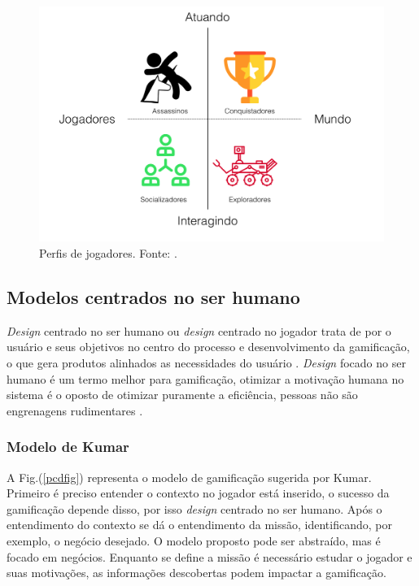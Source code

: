 \begin{figure}[h]
	\centering
		\includegraphics[keepaspectratio=true,scale=0.35]{figuras/bartlefig.png}
	\caption{Perfis de jogadores. Fonte: \cite{bartle1996hearts}.\label{bartlefig}
}
\end{figure}

 

\subsection{Modelos centrados no ser humano}

\textit{Design}  centrado no ser humano ou \textit{design}  centrado no jogador trata de por o usuário e seus objetivos no centro do processo e desenvolvimento da gamificação, o que gera produtos alinhados as necessidades do usuário \cite{kumar2013gamification}. \textit{Design}  focado no ser humano é um termo melhor para gamificação, otimizar a motivação humana no sistema é o oposto de otimizar puramente a eficiência, pessoas não são engrenagens rudimentares \cite{chou2015actionable}.

\newpage

\subsubsection{Modelo de Kumar}

A Fig.(\ref{pcdfig}) representa o modelo de gamificação sugerida por Kumar. Primeiro é preciso entender o contexto no jogador está inserido, o sucesso da gamificação depende disso, por isso \textit{design} centrado no ser humano. 
Após o entendimento do contexto se dá o entendimento da missão, identificando, por exemplo, o negócio desejado. O modelo proposto pode ser abstraído, mas é focado em negócios. Enquanto se define a missão é necessário estudar o jogador e suas motivações, as informações descobertas podem impactar a gamificação.

